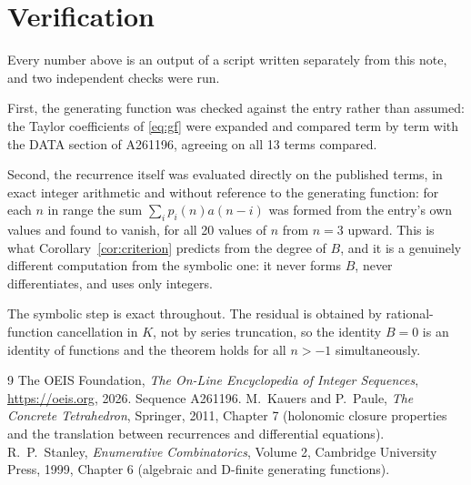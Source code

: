 \documentclass[11pt,a4paper]{article}
\theoremstyle{plain}
\theoremstyle{definition}
\begin{document}
\section{Verification}

Every number above is an output of a script written separately from this note, and two
independent checks were run.

First, the generating function was checked against the entry rather than assumed: the
Taylor coefficients of \eqref{eq:gf} were expanded and compared term by term with the DATA
section of A261196, agreeing on all 13 terms compared.

Second, the recurrence itself was evaluated directly on the published terms, in exact
integer arithmetic and without reference to the generating function: for each $n$ in range
the sum $\sum_{i}p_{i}(n)a(n-i)$ was formed from the entry's own values and found to
vanish, for all 20 values of $n$ from $n=3$ upward. This is what
Corollary~\ref{cor:criterion} predicts from the degree of $B$, and it is a genuinely
different computation from the symbolic one: it never forms $B$, never differentiates, and
uses only integers.

The symbolic step is exact throughout. The residual is obtained by rational-function
cancellation in $K$, not by series truncation, so the identity $B=0$ is an
identity of functions and the theorem holds for all $n>-1$ simultaneously.

\begin{thebibliography}{9}
 The OEIS Foundation, \emph{The On-Line Encyclopedia of Integer Sequences},
\url{https://oeis.org}, 2026. Sequence A261196.
 M.~Kauers and P.~Paule, \emph{The Concrete Tetrahedron}, Springer, 2011,
Chapter 7 (holonomic closure properties and the translation between recurrences and
differential equations).
 R.~P.~Stanley, \emph{Enumerative Combinatorics}, Volume 2, Cambridge
University Press, 1999, Chapter 6 (algebraic and D-finite generating functions).
\end{thebibliography}
\end{document}

